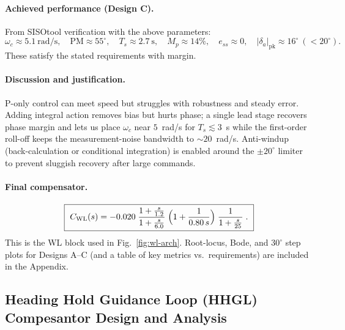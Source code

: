 \paragraph{Achieved performance (Design C).}
From SISOtool verification with the above parameters:
\[
\omega_c \approx 5.1~\mathrm{rad/s},\quad
\mathrm{PM}\approx 55^\circ,\quad
T_s \approx 2.7~\mathrm{s},\quad
M_p \approx 14\%,\quad
e_{ss}\approx 0,\quad
|\delta_a|_{\text{pk}}\approx 16^\circ~(<20^\circ).
\]
These satisfy the stated requirements with margin.

\paragraph{Discussion and justification.}
P-only control can meet speed but struggles with robustness and steady error. Adding integral action
removes bias but hurts phase; a single lead stage recovers phase margin and lets us place $\omega_c$
near $5$~rad/s for $T_s\!\lesssim\!3$~s while the first-order roll-off keeps the measurement-noise
bandwidth to $\sim 20$~rad/s. Anti-windup (back-calculation or conditional integration) is enabled
around the $\pm 20^\circ$ limiter to prevent sluggish recovery after large commands.

\paragraph{Final compensator.}
\[
\boxed{~
C_{\mathrm{WL}}(s)
= -0.020\;
\frac{1+\tfrac{s}{1.2}}{1+\tfrac{s}{6.0}}\;
\Bigl(1+\frac{1}{0.80\,s}\Bigr)\;
\frac{1}{1+\tfrac{s}{25}}\;.
~}
\]
This is the WL block used in Fig.~\ref{fig:wl-arch}. Root-locus, Bode, and $30^\circ$ step plots
for Designs A--C (and a table of key metrics vs.\ requirements) are included in the Appendix.

\subsection{Heading Hold Guidance Loop (HHGL) Compesantor Design and Analysis}

